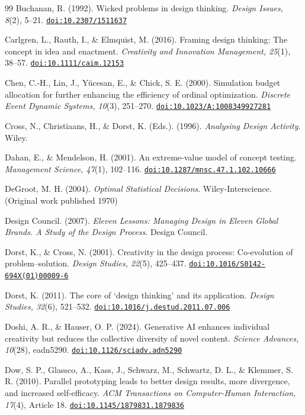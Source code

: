 \documentclass[preprint,review,11pt,authoryear]{elsarticle}
\providecommand{\doi}[1]{\href{https://doi.org/#1}{\nolinkurl{doi:#1}}}
\theoremstyle{definition}
\begin{document}
\begin{thebibliography}{99}
 Buchanan, R. (1992). Wicked problems in design thinking. \textit{Design Issues, 8}(2), 5--21. \doi{10.2307/1511637}

 Carlgren, L., Rauth, I., \& Elmquist, M. (2016). Framing design thinking: The concept in idea and enactment. \textit{Creativity and Innovation Management, 25}(1), 38--57. \doi{10.1111/caim.12153}

 Chen, C.-H., Lin, J., Y{\"u}cesan, E., \& Chick, S. E. (2000). Simulation budget allocation for further enhancing the efficiency of ordinal optimization. \textit{Discrete Event Dynamic Systems, 10}(3), 251--270. \doi{10.1023/A:1008349927281}

 Cross, N., Christiaans, H., \& Dorst, K. (Eds.). (1996). \textit{Analysing Design Activity}. Wiley.

 Dahan, E., \& Mendelson, H. (2001). An extreme-value model of concept testing. \textit{Management Science, 47}(1), 102--116. \doi{10.1287/mnsc.47.1.102.10666}

 DeGroot, M. H. (2004). \textit{Optimal Statistical Decisions}. Wiley-Interscience. (Original work published 1970)

 Design Council. (2007). \textit{Eleven Lessons: Managing Design in Eleven Global Brands. A Study of the Design Process}. Design Council.

 Dorst, K., \& Cross, N. (2001). Creativity in the design process: Co-evolution of problem--solution. \textit{Design Studies, 22}(5), 425--437. \doi{10.1016/S0142-694X(01)00009-6}

 Dorst, K. (2011). The core of `design thinking' and its application. \textit{Design Studies, 32}(6), 521--532. \doi{10.1016/j.destud.2011.07.006}

 Doshi, A. R., \& Hauser, O. P. (2024). Generative AI enhances individual creativity but reduces the collective diversity of novel content. \textit{Science Advances, 10}(28), eadn5290. \doi{10.1126/sciadv.adn5290}

 Dow, S. P., Glassco, A., Kass, J., Schwarz, M., Schwartz, D. L., \& Klemmer, S. R. (2010). Parallel prototyping leads to better design results, more divergence, and increased self-efficacy. \textit{ACM Transactions on Computer-Human Interaction, 17}(4), Article 18. \doi{10.1145/1879831.1879836}


\end{thebibliography}
\end{document}
